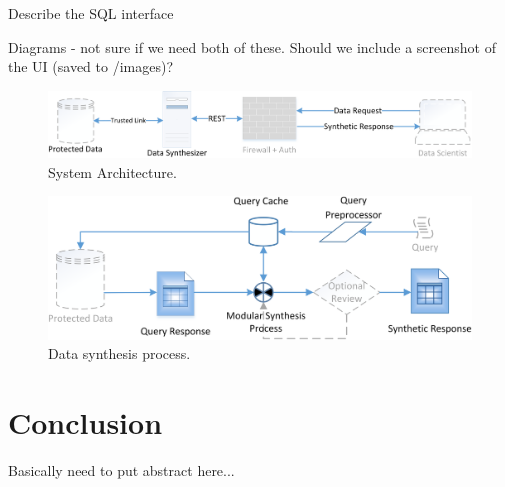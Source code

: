 \documentclass{article}
\begin{document}
Describe the SQL interface

Diagrams - not sure if we need both of these. Should we include a screenshot of the UI (saved to /images)?

\begin{figure}[h]
  \centering
  \includegraphics[width=\textwidth]{prototype_architecture}
  \caption{System Architecture.}
\end{figure}

\begin{figure}[h]
  \centering
  \includegraphics[width=\textwidth]{data_synthesis_process}
  \caption{Data synthesis process.}
\end{figure}


\section{Conclusion}

Basically need to put abstract here...





\end{document}
